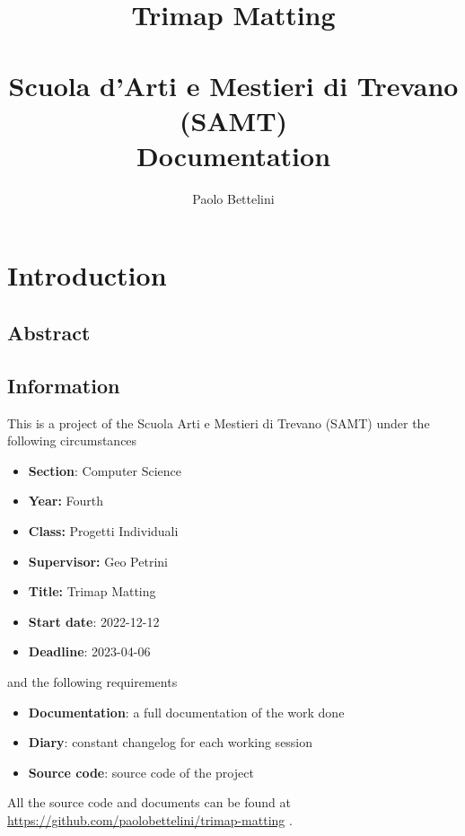 \documentclass[a4paper]{article}
\title{%
    Trimap Matting \\
    \phantom{} \\
    \large Scuola d'Arti e Mestieri di Trevano (SAMT) \\
    \large Documentation
}
\author{Paolo Bettelini}
\date{}
\begin{document}
\maketitle

\pagebreak

\tableofcontents

\pagebreak

\section{Introduction}

\subsection{Abstract}

\subsection{Information}

This is a project of the Scuola Arti e Mestieri di Trevano (SAMT) under the following circumstances

\begin{itemize}
    \item \textbf{Section}: Computer Science
    \item \textbf{Year:} Fourth
    \item \textbf{Class:} Progetti Individuali
    \item \textbf{Supervisor:} Geo Petrini
    \item \textbf{Title:} Trimap Matting
    \item \textbf{Start date}: 2022-12-12
    \item \textbf{Deadline}: 2023-04-06
\end{itemize}

and the following requirements

\begin{itemize}
    \item \textbf{Documentation}: a full documentation of the work done
    \item \textbf{Diary}: constant changelog for each working session
    \item \textbf{Source code}: source code of the project
\end{itemize}

All the source code and documents can be found at
\href{https://github.com/paolobettelini/trimap-matting}
{https://github.com/paolobettelini/trimap-matting}
\cite{gitrepo}.
\end{document}
